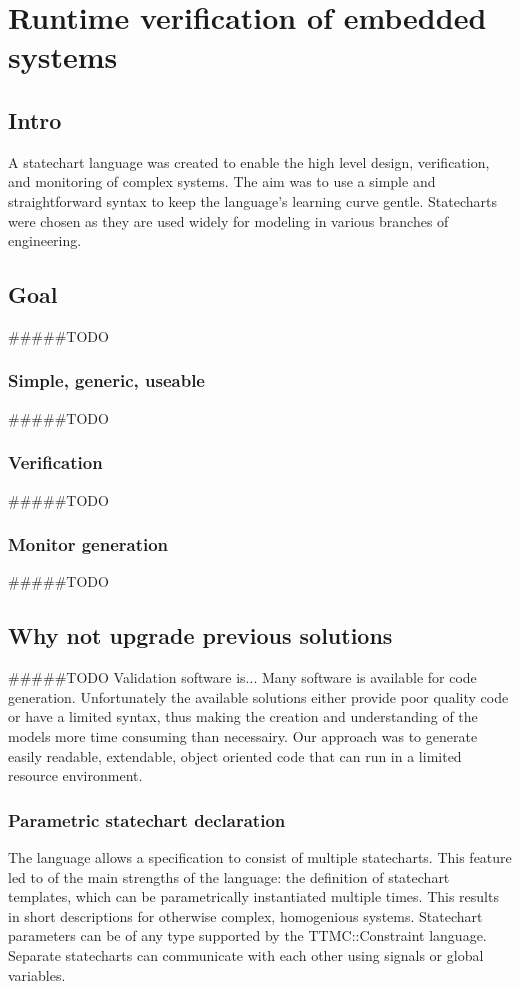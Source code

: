 \chapter{Runtime verification of embedded systems}
\label{chap:runtime_verification}

\section{Intro}
A statechart language was created to enable the high level design, verification, and monitoring of complex systems. The aim was to use a simple and straightforward syntax to keep the language’s learning curve gentle. Statecharts were chosen as they are used widely for modeling in various branches of engineering.
\section{Goal}
#####TODO
  \subsection{Simple, generic, useable}
#####TODO
  \subsection{Verification}
#####TODO
  \subsection{Monitor generation}
#####TODO
\section{Why not upgrade previous solutions}
#####TODO
Validation software is... 
Many software is available for code generation. Unfortunately the available solutions either provide poor quality code or have a limited syntax, thus making the creation and understanding of the models more time consuming than necessairy. Our approach was to generate easily readable, extendable, object oriented code that can run in a limited resource environment.
  \subsection{Parametric statechart declaration}
The language allows a specification to consist of multiple statecharts. This feature led to of the main strengths of the language: the definition of statechart templates, which can be parametrically instantiated multiple times. This results in short descriptions for otherwise complex, homogenious systems. Statechart parameters can be of any type supported by the TTMC::Constraint language. Separate statecharts can communicate with each other using signals or global variables.
